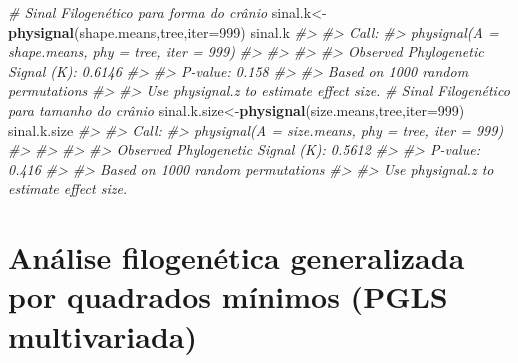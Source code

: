\documentclass[
]{book}
\newenvironment{Shaded}{\begin{snugshade}}{\end{snugshade}}
\newcommand{\AttributeTok}[1]{\textcolor[rgb]{0.13,0.29,0.53}{#1}}
\newcommand{\CommentTok}[1]{\textcolor[rgb]{0.56,0.35,0.01}{\textit{#1}}}
\newcommand{\DecValTok}[1]{\textcolor[rgb]{0.00,0.00,0.81}{#1}}
\newcommand{\FunctionTok}[1]{\textcolor[rgb]{0.13,0.29,0.53}{\textbf{#1}}}
\newcommand{\NormalTok}[1]{#1}
\newcommand{\OtherTok}[1]{\textcolor[rgb]{0.56,0.35,0.01}{#1}}
\begin{document}
\begin{Shaded}
\begin{Highlighting}[]
\CommentTok{\# Sinal Filogenético para forma do crânio}
\NormalTok{sinal.k}\OtherTok{\textless{}{-}}\FunctionTok{physignal}\NormalTok{(shape.means,tree,}\AttributeTok{iter=}\DecValTok{999}\NormalTok{)}
\NormalTok{sinal.k}
\CommentTok{\#\textgreater{} }
\CommentTok{\#\textgreater{} Call:}
\CommentTok{\#\textgreater{} physignal(A = shape.means, phy = tree, iter = 999) }
\CommentTok{\#\textgreater{} }
\CommentTok{\#\textgreater{} }
\CommentTok{\#\textgreater{} }
\CommentTok{\#\textgreater{} Observed Phylogenetic Signal (K): 0.6146}
\CommentTok{\#\textgreater{} }
\CommentTok{\#\textgreater{} P{-}value: 0.158}
\CommentTok{\#\textgreater{} }
\CommentTok{\#\textgreater{} Based on 1000 random permutations}
\CommentTok{\#\textgreater{} }
\CommentTok{\#\textgreater{}  Use physignal.z to estimate effect size.}
\CommentTok{\# Sinal Filogenético para tamanho do crânio}
\NormalTok{sinal.k.size}\OtherTok{\textless{}{-}}\FunctionTok{physignal}\NormalTok{(size.means,tree,}\AttributeTok{iter=}\DecValTok{999}\NormalTok{)}
\NormalTok{sinal.k.size}
\CommentTok{\#\textgreater{} }
\CommentTok{\#\textgreater{} Call:}
\CommentTok{\#\textgreater{} physignal(A = size.means, phy = tree, iter = 999) }
\CommentTok{\#\textgreater{} }
\CommentTok{\#\textgreater{} }
\CommentTok{\#\textgreater{} }
\CommentTok{\#\textgreater{} Observed Phylogenetic Signal (K): 0.5612}
\CommentTok{\#\textgreater{} }
\CommentTok{\#\textgreater{} P{-}value: 0.416}
\CommentTok{\#\textgreater{} }
\CommentTok{\#\textgreater{} Based on 1000 random permutations}
\CommentTok{\#\textgreater{} }
\CommentTok{\#\textgreater{}  Use physignal.z to estimate effect size.}
\end{Highlighting}
\end{Shaded}

\section{Análise filogenética generalizada por quadrados mínimos (PGLS multivariada)}\label{anuxe1lise-filogenuxe9tica-generalizada-por-quadrados-muxednimos-pgls-multivariada}
\end{document}
